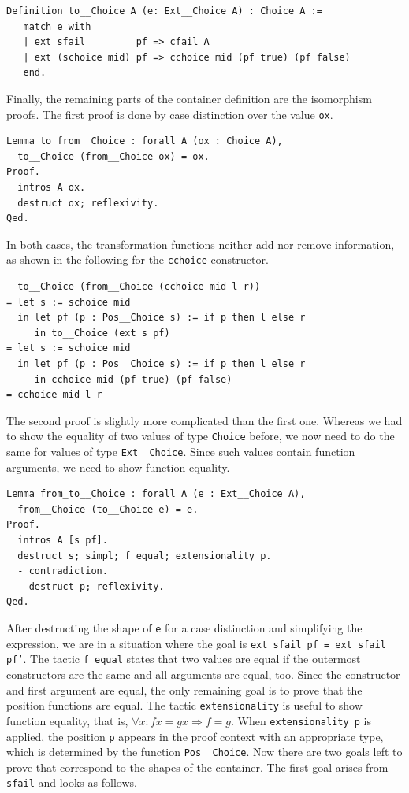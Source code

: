 \documentclass[a4paper, 11pt, fleqn, twoside]{scrreprt}
\newcommand{\cinl}[1]{\texttt{#1}}
\begin{document}
\begin{verbatim}
Definition to__Choice A (e: Ext__Choice A) : Choice A :=
   match e with
   | ext sfail         pf => cfail A
   | ext (schoice mid) pf => cchoice mid (pf true) (pf false)
   end.
\end{verbatim}

Finally, the remaining parts of the container definition are the isomorphism proofs.
The first proof is done by case distinction over the value \cinl{ox}.

\begin{verbatim}
Lemma to_from__Choice : forall A (ox : Choice A),
  to__Choice (from__Choice ox) = ox.
Proof.
  intros A ox.
  destruct ox; reflexivity.
Qed.
\end{verbatim}

In both cases, the transformation functions neither add nor remove information, as shown in the following for the \cinl{cchoice} constructor.

\begin{verbatim}
  to__Choice (from__Choice (cchoice mid l r))
= let s := schoice mid
  in let pf (p : Pos__Choice s) := if p then l else r
     in to__Choice (ext s pf)
= let s := schoice mid
  in let pf (p : Pos__Choice s) := if p then l else r
     in cchoice mid (pf true) (pf false)
= cchoice mid l r
\end{verbatim}

The second proof is slightly more complicated than the first one.
Whereas we had to show the equality of two values of type \cinl{Choice} before, we now need to do the same for values of type \cinl{Ext__Choice}.
Since such values contain function arguments, we need to show function equality.

\begin{verbatim}
Lemma from_to__Choice : forall A (e : Ext__Choice A),
  from__Choice (to__Choice e) = e.
Proof.
  intros A [s pf].
  destruct s; simpl; f_equal; extensionality p.
  - contradiction.
  - destruct p; reflexivity.
Qed. 
\end{verbatim}

After destructing the shape of \cinl{e} for a case distinction and simplifying the expression, we are in a situation where the goal is \cinl{ext sfail pf = ext sfail pf'}.
The tactic \cinl{f_equal} states that two values are equal if the outermost constructors are the same and all arguments are equal, too.
Since the constructor and first argument are equal, the only remaining goal is to prove that the position functions are equal.
The tactic \cinl{extensionality} is useful to show function equality, that is, $\forall x: f x = g x \Rightarrow f = g$.
When \cinl{extensionality p} is applied, the position \cinl{p} appears in the proof context with an appropriate type, which is determined by the function \cinl{Pos__Choice}.
Now there are two goals left to prove that correspond to the shapes of the container.
The first goal arises from \cinl{sfail} and looks as follows.
\end{document}
